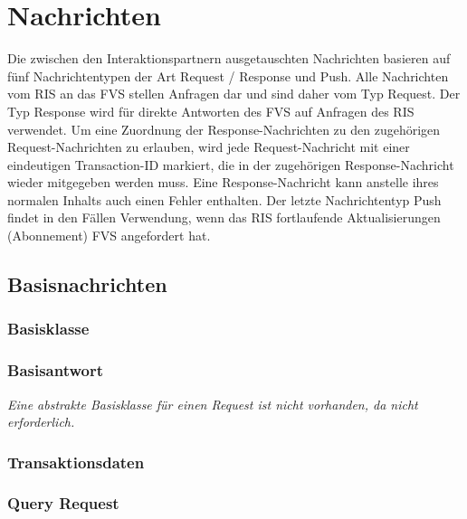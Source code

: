 \chapter{Nachrichten}
\label{cha:Nachrichten}
Die zwischen den Interaktionspartnern ausgetauschten Nachrichten basieren auf fünf Nachrichtentypen der Art Request / Response und Push. Alle Nachrichten vom RIS an das FVS stellen Anfragen dar und sind daher vom Typ Request. Der Typ Response wird für direkte Antworten des FVS auf Anfragen des RIS verwendet. Um eine Zuordnung der Response-Nachrichten zu den zugehörigen Request-Nachrichten zu erlauben, wird jede Request-Nachricht mit einer eindeutigen Transaction-ID markiert, die in der zugehörigen Response-Nachricht wieder mitgegeben werden muss. Eine Response-Nachricht kann anstelle ihres normalen Inhalts auch einen Fehler enthalten. Der letzte Nachrichtentyp Push findet in den Fällen Verwendung, wenn das RIS fortlaufende Aktualisierungen (Abonnement) FVS angefordert hat.

\section{Basisnachrichten}
\label{sec:Nachrichten:Basisnachrichten}

\subsection*{Basisklasse}



\subsection*{Basisantwort}


\medskip

\textit{Eine abstrakte Basisklasse für einen Request ist nicht vorhanden, da nicht erforderlich.}

\subsection*{Transaktionsdaten}



\subsection*{Query Request}



